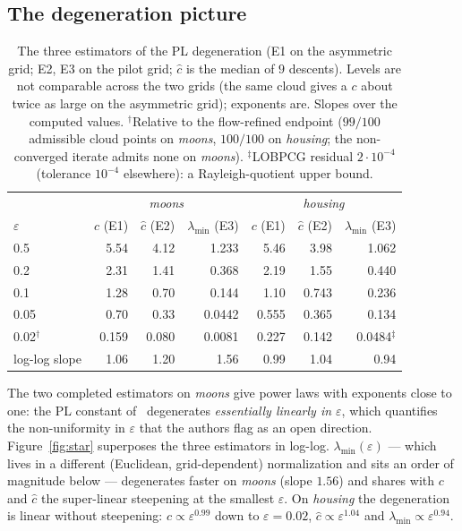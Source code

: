 \documentclass[11pt,leqno]{amsart}
\newcommand{\eps}{\varepsilon}
\numberwithin{equation}{section}
\theoremstyle{definition}
\begin{document}
\subsection{The degeneration picture}
\label{sec:degeneration}

\begin{table}[ht]
\centering\small
\begin{tabular}{l rrr @{\qquad} rrr}
\toprule
& \multicolumn{3}{c}{\emph{moons}} & \multicolumn{3}{c}{\emph{housing}}\\
$\eps$ & $c$ (E1) & $\hat c$ (E2) & $\lambda_{\min}$ (E3)
       & $c$ (E1) & $\hat c$ (E2) & $\lambda_{\min}$ (E3)\\
\midrule
0.5  & 5.54 & 4.12 & 1.233  & 5.46 & 3.98 & 1.062\\
0.2  & 2.31 & 1.41 & 0.368  & 2.19 & 1.55 & 0.440\\
0.1  & 1.28 & 0.70 & 0.144  & 1.10 & 0.743 & 0.236\\
0.05 & 0.70 & 0.33 & 0.0442 & 0.555 & 0.365 & 0.134\\
0.02$^\dagger$ & 0.159 & 0.080 & 0.0081 & 0.227 & 0.142 & 0.0484$^\ddagger$\\
\midrule
log-log slope & 1.06 & 1.20 & 1.56 & 0.99 & 1.04 & 0.94\\
\bottomrule
\end{tabular}
\vskip 2pt
\caption{The three estimators of the PL degeneration (E1 on the asymmetric
grid; E2, E3 on the pilot grid; $\hat c$ is the median of $9$ descents).
Levels are not comparable across the two grids (the same cloud gives a
$c$ about twice as large on the asymmetric grid); exponents are.
Slopes over the computed values.
$^\dagger$Relative to the flow-refined endpoint ($99/100$ admissible cloud
points on \emph{moons}, $100/100$ on \emph{housing}; the non-converged
iterate admits none on \emph{moons}).
$^\ddagger$LOBPCG residual $2\cdot10^{-4}$ (tolerance $10^{-4}$
elsewhere): a Rayleigh-quotient upper bound.}
\label{tab:estimators}
\end{table}

The two completed estimators on \emph{moons} give power laws with exponents
close to one: the PL constant of~\cite{DaudinDelarue2025} degenerates
\emph{essentially linearly in $\eps$}, which quantifies the non-uniformity
in $\eps$ that the authors flag as an open direction.
Figure~\ref{fig:star} superposes the three estimators in log-log.
$\lambda_{\min}(\eps)$ --- which lives in a different (Euclidean,
grid-dependent) normalization and sits an order of magnitude below ---
degenerates faster on \emph{moons} (slope $1.56$) and shares with $c$
and $\hat c$ the super-linear steepening at the smallest $\eps$.  On
\emph{housing} the degeneration is linear without steepening:
$c\propto\eps^{0.99}$ down to $\eps=0.02$, $\hat c\propto\eps^{1.04}$ and
$\lambda_{\min}\propto\eps^{0.94}$.
\end{document}
